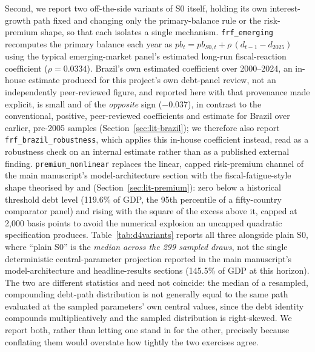 \documentclass[11pt,a4paper]{article}
\begin{document}
Second, we report two off-the-side variants of \textsc{S0} itself, holding its own interest-growth path fixed and changing only the primary-balance rule or the risk-premium shape, so that each isolates a single mechanism. \texttt{frf\_emerging} recomputes the primary balance each year as $pb_t = pb_{S0,t} + \rho\,(d_{t-1}-d_{2025})$ using the typical emerging-market panel's estimated long-run fiscal-reaction coefficient ($\rho=0.0334$). Brazil's own estimated coefficient over 2000--2024, an in-house estimate produced for this project's own debt-panel review, not an independently peer-reviewed figure, and reported here with that provenance made explicit, is small and of the \emph{opposite} sign ($-0.037$), in contrast to the conventional, positive, peer-reviewed coefficients \citet{demello2008} and \citet{mendoncasantossachsida2009} estimate for Brazil over earlier, pre-2005 samples (Section~\ref{sec:lit-brazil}); we therefore also report \texttt{frf\_brazil\_robustness}, which applies this in-house coefficient instead, read as a robustness check on an internal estimate rather than as a published external finding. \texttt{premium\_nonlinear} replaces the linear, capped risk-premium channel of the main manuscript's model-architecture section with the fiscal-fatigue-style shape theorised by \citet{ghoshkimmendozaostryqureshi2013} and \citet{bi2012} (Section~\ref{sec:lit-premium}): zero below a historical threshold debt level (119.6\% of GDP, the 95th percentile of a fifty-country comparator panel) and rising with the square of the excess above it, capped at 2,000 basis points to avoid the numerical explosion an uncapped quadratic specification produces. Table~\ref{tab:d4variants} reports all three alongside plain \textsc{S0}, where ``plain \textsc{S0}'' is the \emph{median across the 299 sampled draws}, not the single deterministic central-parameter projection reported in the main manuscript's model-architecture and headline-results sections (145.5\% of GDP at this horizon). The two are different statistics and need not coincide: the median of a resampled, compounding debt-path distribution is not generally equal to the same path evaluated at the sampled parameters' own central values, since the debt identity compounds multiplicatively and the sampled distribution is right-skewed. We report both, rather than letting one stand in for the other, precisely because conflating them would overstate how tightly the two exercises agree.
\end{document}
